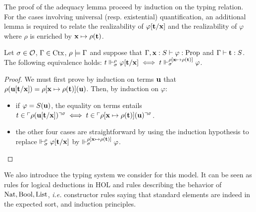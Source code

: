 \documentclass[a4paper,UKenglish,cleveref, autoref, thm-restate]{lipics-v2021}
\begin{document}
The proof of the adequacy lemma proceed by induction on the typing relation. For the cases involving universal (resp. existential) quantification, an additional lemma is required to relate the realizability of $\varphi[\mathbf{t}/\mathbf{x}]$ and the realizability of $\varphi$ where $\rho$ is enriched by $\mathbf{x}\mapsto \rho(\mathbf{t})$.

\begin{lemma}
  Let $\sigma \in \mathcal O$, $\Gamma \in \mathrm{Ctx}$, $\rho \models \Gamma$ and suppose that $\Gamma, \mathbf{x} : S \vdash \varphi : \mathrm{Prop}$ and $\Gamma\vdash \mathbf{t} : S$. The following equivalence holds:
  $t \Vdash_{\sigma}^{\rho} \varphi[\mathbf{t}/\mathbf{x}] \iff t \Vdash_{\sigma}^{\rho[\mathbf{x}\mapsto \rho(\mathbf{t})]}\varphi$.
\end{lemma}



\begin{proof}
 We must first prove by induction on terms $\mathbf{u}$ that $\rho(\mathbf{u}[\mathbf{t}/\mathbf{x}]) = \rho[\mathbf{x} \mapsto \rho(\mathbf{t})](\mathbf{u})$. Then, by induction on $\varphi$:
 \begin{itemize}
 \item if $\varphi = S(\mathbf{u})$, the equality on terms entails  $t \in \ulcorner\rho(\mathbf{u}[\mathbf{t}/\mathbf{x}])\urcorner^{\sigma} \iff t \in \ulcorner\rho[\mathbf{x}\mapsto \rho(\mathbf{t})](\mathbf{u})\urcorner^{\sigma}$.
 \item the other four cases are straightforward by using the induction hypothesis to replace $\Vdash_{\sigma}^{\rho} \varphi[\mathbf{t}/\mathbf{x}]$ by $\Vdash_{\sigma}^{\rho[\mathbf{x}\mapsto\rho(\mathbf{t})]} \varphi$.\qedhere
 \end{itemize}

\end{proof}

We also introduce the typing system we consider for this model. It can be seen as rules for logical deductions in HOL and rules describing the behavior of $\mathrm{Nat},\mathrm{Bool},\mathrm{List}$, \textit{i.e.} constructor rules saying that standard elements are indeed in the expected sort, and induction principles.
\end{document}
